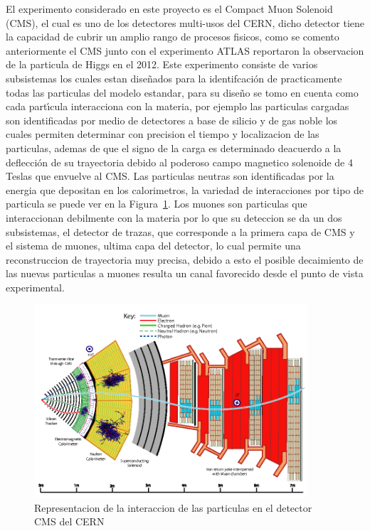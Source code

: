El experimento considerado en este proyecto es el Compact Muon Solenoid (CMS), el cual es uno de los detectores multi-usos del CERN, dicho detector tiene la capacidad de cubrir un amplio rango de procesos fisicos, como se comento anteriormente el CMS junto con el experimento ATLAS reportaron la observacion de la particula de Higgs en el 2012.  Este experimento consiste de varios subsistemas los cuales estan dise\~nados para la identifcaci\'on de practicamente todas las particulas del modelo estandar, para su dise\~no se tomo en cuenta como cada part\'{\i}cula interacciona con la materia, por ejemplo las particulas cargadas son identificadas por medio de detectores a base de silicio y de gas noble los cuales permiten determinar con precision el tiempo y localizacion de las particulas, ademas de que el signo de la carga es determinado deacuerdo a la deflecci\'on de su trayectoria debido al poderoso campo magnetico solenoide de 4 Teslas que envuelve al CMS.  Las particulas neutras son identificadas por la energia que depositan en los calorimetros, la variedad de interacciones por tipo de particula se puede ver en la Figura~\ref{fig:cms_interaction}. Los muones son particulas que interaccionan debilmente con la materia por lo que su deteccion se da un dos subsistemas, el detector de trazas, que corresponde a la primera capa de CMS y el sistema de muones, ultima capa del detector, lo cual permite una reconstruccion de trayectoria muy precisa, debido a esto el posible decaimiento de las nuevas particulas a muones resulta un canal favorecido desde el punto de vista experimental.


\begin{figure}
\begin{center}
 \includegraphics[width=4.0in]{cms_interaction.png}
  \caption{Representacion de la interaccion de las particulas en el detector CMS del CERN}
 \label{fig:cms_interaction}
 \end{center}
\end{figure}

